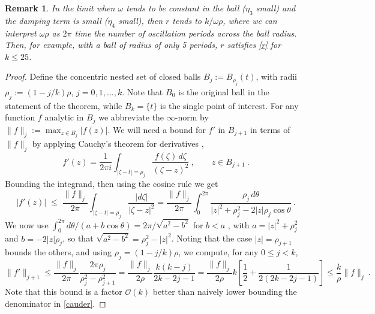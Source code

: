 \documentclass[10pt]{article}
\newcommand{\be}{\begin{equation}}
\newcommand{\ee}{\end{equation}}
\newcommand{\bigO}{{\mathcal O}}
\newtheorem{rmk}[thm]{Remark}
\newcommand{\om}{\omega}
\begin{document}
\begin{rmk}
    In the limit when $\om$ tends to be constant in the ball ($\eta_3$ small) and the damping term is small ($\eta_4$ small),
  then $r$ tends to $k/\om \rho$, where we can interpret $\om\rho$ as $2\pi$
    time the number of oscillation periods across the ball radius.
    Then, for example, with a ball of radius of only 5 periods, $r$ satisfies \cref{r}
    for $k\le 25$.
\end{rmk}

\begin{proof}
  Define the concentric nested set of closed balls $B_j := B_{\rho_j}(t)$,
  with radii $\rho_j := (1-j/k)\rho$, $j=0,1,\dots,k$. Note that
  $B_0$ is the original ball in the statement of the theorem, while
  $B_k = \{t\}$ is the single point of interest.
  For any function $f$ analytic in $B_j$ we abbreviate the $\infty$-norm by
  $\|f\|_j := \max_{z \in B_j}|f(z)|$.
  We will need a bound for $f'$ in $B_{j+1}$ in terms of $\|f\|_j$ by
  applying Cauchy's theorem for derivatives
  \cite{steinshakarchi},
  \be
  f'(z) = \frac{1}{2\pi i} \int_{|\zeta-t|=\rho_j} \frac{f(\zeta)\, d\zeta}{(\zeta-z)^2}
  ~, \qquad z \in B_{j+1}~.
  \label{cauder}
  \ee
  Bounding the integrand, then using the cosine rule we get
  $$
  |f'(z)| \;\le \;
  \frac{\|f\|_j}{2\pi} \int_{|\zeta-t| = \rho_j} \frac{|d\zeta|}{|\zeta-z|^2}
  =
  \frac{\|f\|_j}{2\pi} \int_0^{2\pi} \frac{\rho_j\, d\theta}{|z|^2 + \rho_j^2 - 2|z|\rho_j \cos \theta}~.
  $$
  We now use $\int_{0}^{2\pi} d\theta /(a + b \cos \theta) = 2\pi/\sqrt{a^2-b^2}$
  for $b<a$ \cite[Eq.~3.613.1]{GR8}, with
  $a = |z|^2 + \rho_j^2$ and $b = -2|z|\rho_j$, so that
  $\sqrt{a^2-b^2} = \rho_j^2-|z|^2$.
  Noting that the case $|z| = \rho_{j+1}$ bounds the others,
  and using $\rho_j=(1-j/k)\rho$, we compute, for any $0\le j < k$,
  \be
  \|f'\|_{j+1} \le
  \frac{\|f\|_j}{2\pi} \frac{2\pi\rho_j}{\rho_j^2-\rho_{j+1}^2}
  =
  \frac{\|f\|_j}{2 \rho} \frac{k(k-j)}{2k-2j-1}
  =
  \frac{\|f\|_j}{2 \rho} k \left[ \frac{1}{2} + \frac{1}{2(2k-2j-1)}\right]
  \le
  \frac{k}{\rho}\|f\|_j~.
  \label{derbnd}
  \ee
  Note that this bound is a factor $\bigO(k)$ better than naively
  lower bounding the denominator in \cref{cauder}.
  

\end{proof}
\end{document}

